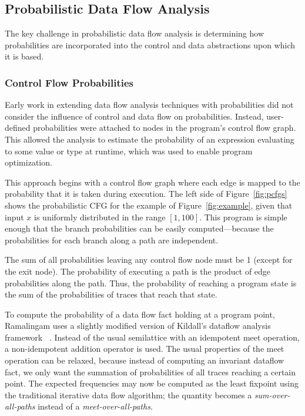 \subsection{Probabilistic Data Flow Analysis}
\label{sec:pdfa}

The key challenge in probabilistic data flow analysis is
determining how probabilities are incorporated into the control
and data abstractions upon which it is based.

\subsubsection{Control Flow Probabilities}
Early work in extending data flow analysis 
techniques with probabilities did not consider
the influence of control and data flow on probabilities.
Instead, user-defined probabilities 
were attached to nodes in the program's control flow graph.  
This allowed the analysis to estimate
the probability of an expression evaluating 
to some value or type at runtime, which was used to enable
program optimization.

This approach begins with a control flow graph where each edge is 
mapped to the probability that it is taken during execution.
The left side of Figure~\ref{fig:pcfgs} shows the probabilistic CFG for the
example of Figure~\ref{fig:example}, given that input $x$
is uniformly distributed in the range $[1,100]$.  
This program is simple enough that the branch probabilities can
be easily computed---because the probabilities for each
branch along a path are independent.

The sum of all probabilities leaving any control flow node must be 1
(except for the exit node).
The probability of executing a path is the product of 
edge probabilities along the path.
Thus, the probability of reaching a program state is the
sum of the probabilities of traces that reach that state.



To compute the probability of a data flow fact holding 
at a program point, Ramalingam uses a slightly
modified version of Kildall's dataflow analysis framework
~\cite{ramalingam1996data}.
Instead of the usual semilattice with an idempotent meet
operation, a non-idempotent addition operator is used.
The usual properties of the meet operation can be
relaxed, because instead of computing an invariant dataflow
fact, we only want the summation of probabilities of all
traces reaching a certain point.
The expected frequencies may now be computed as the least
fixpoint using the traditional iterative data flow algorithm;
the quantity becomes a
{\sl sum-over-all-paths} instead of a {\sl meet-over-all-paths}.

